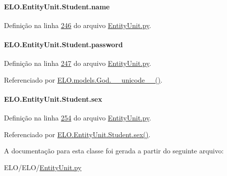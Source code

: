 \hypertarget{classELO_1_1EntityUnit_1_1Student_a33329ec1da0181f6305626b4444a8e0b}{}
\paragraph[{name}]{\setlength{\rightskip}{0pt plus 5cm}E\+L\+O.\+Entity\+Unit.\+Student.\+name}\label{classELO_1_1EntityUnit_1_1Student_a33329ec1da0181f6305626b4444a8e0b}


Definição na linha \hyperlink{EntityUnit_8py_source_l00246}{246} do arquivo \hyperlink{EntityUnit_8py_source}{Entity\+Unit.\+py}.

\hypertarget{classELO_1_1EntityUnit_1_1Student_a834cad492221bfe3f26e590666e13f9a}{}
\paragraph[{password}]{\setlength{\rightskip}{0pt plus 5cm}E\+L\+O.\+Entity\+Unit.\+Student.\+password}\label{classELO_1_1EntityUnit_1_1Student_a834cad492221bfe3f26e590666e13f9a}


Definição na linha \hyperlink{EntityUnit_8py_source_l00247}{247} do arquivo \hyperlink{EntityUnit_8py_source}{Entity\+Unit.\+py}.



Referenciado por \hyperlink{classELO_1_1models_1_1God_ad885cef3d586b18dd3639ebf3bfd66eb}{E\+L\+O.\+models.\+God.\+\_\+\+\_\+unicode\+\_\+\+\_\+()}.

\hypertarget{classELO_1_1EntityUnit_1_1Student_a5ca85c1d00044512e5dc3cfabac4ff9f}{}
\paragraph[{sex}]{\setlength{\rightskip}{0pt plus 5cm}E\+L\+O.\+Entity\+Unit.\+Student.\+sex}\label{classELO_1_1EntityUnit_1_1Student_a5ca85c1d00044512e5dc3cfabac4ff9f}


Definição na linha \hyperlink{EntityUnit_8py_source_l00254}{254} do arquivo \hyperlink{EntityUnit_8py_source}{Entity\+Unit.\+py}.



Referenciado por \hyperlink{classELO_1_1EntityUnit_1_1Student_a4ebac84a31d7872ff7b0b4195ffd8821}{E\+L\+O.\+Entity\+Unit.\+Student.\+sex()}.



A documentação para esta classe foi gerada a partir do seguinte arquivo\+:\begin{DoxyCompactItemize}
\item 
E\+L\+O/\+E\+L\+O/\hyperlink{EntityUnit_8py}{Entity\+Unit.\+py}\end{DoxyCompactItemize}
